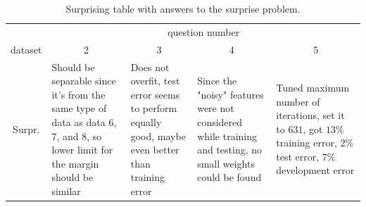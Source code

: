 \documentclass[12pt]{article}
\begin{document}
\begin{table}[h!]
	\centering
	\begin{tabularx}{\textwidth}{c|X|X|X|X|}
		& \multicolumn{4}{c|}{question number} \\
		dataset & \multicolumn{1}{c}{2} & \multicolumn{1}{c}{3} & \multicolumn{1}{c}{4} & \multicolumn{1}{c|}{5} \\
		\midrule
		Surpr.     &   Should be separable since it's from the same type of data as data 6, 7, and 8, so lower limit for the margin should be similar   &  Does not overfit, test error seems to perform equally good, maybe even better than training error      &   Since the "noisy" features were not considered while training and testing, no small weights could be found & Tuned maximum number of iterations, set it to $631$, got $13\%$ training error, $2\%$ test error, $7\%$ development error \\
		\midrule
		\bottomrule
	\end{tabularx}%
	\caption{Surprising table with answers to the surprise problem.}
	\label{tab:3}%
\end{table}%
\end{document}
